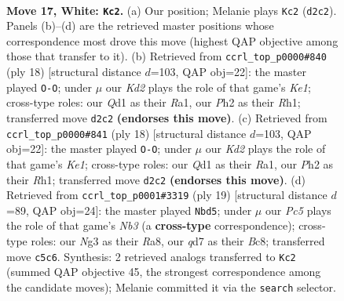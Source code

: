 \documentclass[11pt]{article}
\begin{document}
\clearpage

\begin{figure}[p]\centering
\begin{subfigure}{0.46\textwidth}\centering
\resizebox{\linewidth}{!}{%
\newchessgame
\chessboard[
  setfen={r1b2kr1/1p1qbp1p/p5p1/2Ppn3/5n2/1N4N1/PP1K1PPP/1RBQ1B1R w - - 2 17},
  showmover=false,
  pgfstyle=straightmove, color=movearrow, markmove={d2-c2}
]}
\caption{}
\end{subfigure}\hfill
\begin{subfigure}{0.46\textwidth}\centering
\resizebox{\linewidth}{!}{%
\newchessgame
\chessboard[
  setfen={r1bq1rk1/ppp1npbp/3p2p1/2n5/2PNP3/2N1B3/PP1QBPPP/R3K2R w KQ - 1 10},
  showmover=false,
  pgfstyle=straightmove, color=movearrow, markmove={e1-g1}
]}
\caption{}
\end{subfigure}
\\[4pt]
\begin{subfigure}{0.46\textwidth}\centering
\resizebox{\linewidth}{!}{%
\newchessgame
\chessboard[
  setfen={r1bq1rk1/ppp1npbp/3p2p1/2n5/2PNP3/2N1B3/PP1QBPPP/R3K2R w KQ - 1 10},
  showmover=false,
  pgfstyle=straightmove, color=movearrow, markmove={e1-g1}
]}
\caption{}
\end{subfigure}\hfill
\begin{subfigure}{0.46\textwidth}\centering
\resizebox{\linewidth}{!}{%
\newchessgame
\chessboard[
  setfen={r1bqk2r/pp3ppp/1npb1n2/8/5P2/2NNBQ1P/PPP3P1/R3KB1R b KQkq - 3 10},
  showmover=false,
  pgfstyle=straightmove, color=movearrow, markmove={b6-d5}
]}
\caption{}
\end{subfigure}
\caption{\textbf{Move 17, White: \texttt{Kc2}.} (a) Our position; Melanie plays \texttt{Kc2} (\texttt{d2c2}). Panels (b)--(d) are the retrieved master positions whose correspondence most drove this move (highest QAP objective among those that transfer to it). (b) Retrieved from \texttt{ccrl\_top\_p0000\#840} (ply 18) [structural distance $d$=103, QAP obj=22]: the master played \texttt{O-O}; under $\mu$ our \emph{Kd2} plays the role of that game's \emph{Ke1}; cross-type roles: our \emph{Q}d1 as their \emph{R}a1, our \emph{P}h2 as their \emph{R}h1; transferred move \texttt{d2c2} \textbf{(endorses this move)}. (c) Retrieved from \texttt{ccrl\_top\_p0000\#841} (ply 18) [structural distance $d$=103, QAP obj=22]: the master played \texttt{O-O}; under $\mu$ our \emph{Kd2} plays the role of that game's \emph{Ke1}; cross-type roles: our \emph{Q}d1 as their \emph{R}a1, our \emph{P}h2 as their \emph{R}h1; transferred move \texttt{d2c2} \textbf{(endorses this move)}. (d) Retrieved from \texttt{ccrl\_top\_p0001\#3319} (ply 19) [structural distance $d$=89, QAP obj=24]: the master played \texttt{Nbd5}; under $\mu$ our \emph{Pc5} plays the role of that game's \emph{Nb3} (a \textbf{cross-type} correspondence); cross-type roles: our \emph{N}g3 as their \emph{R}a8, our \emph{q}d7 as their \emph{B}c8; transferred move \texttt{c5c6}. Synthesis: 2 retrieved analogs transferred to \texttt{Kc2} (summed QAP objective 45, the strongest correspondence among the candidate moves); Melanie committed it via the \texttt{search} selector.}
\label{fig:thought-m32}
\end{figure}
\end{document}
